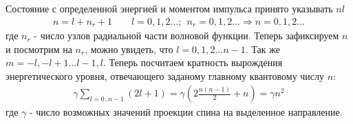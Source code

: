 \documentclass[__main__.tex]{subfiles}
\begin{document}
Состояние с определенной энергией и моментом импульса принято указывать $nl$\\
\begin{gather}
n = l + n_r + 1 \qquad l = 0,1,2...; \ \ n_r = 0,1,2... \Longrightarrow n = 0,1,2...
\end{gather}
где $n_r$ - число узлов радиальной части волновой функции. Теперь зафиксируем $n$ и посмотрим на $n_r$, можно увидеть, что $l = 0,1,2...n-1$. Так же $m = -l,-l+1 ... l-1,l$. Теперь посчитаем кратность вырождения энергетического уровня, отвечающего заданому главному квантовому числу $n$:\\
\begin{gather}
\gamma \sum_{l=0..n-1}(2l+1) = \gamma (2\frac{n(n-1)}{2}+n) = \gamma n^2
\end{gather}
где $\gamma$ - число возможных значений проекции спина на выделенное направление.\\
\end{document}
